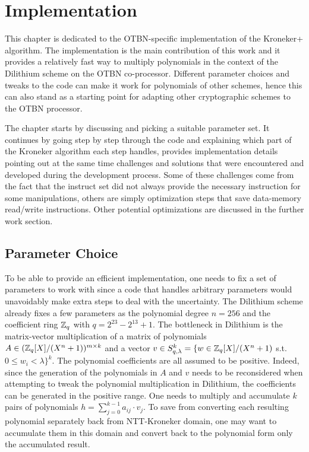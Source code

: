 
\chapter{Implementation}\label{chapter:implementation}

This chapter is dedicated to the OTBN-specific implementation of the Kroneker+ algorithm. The implementation is the main contribution of this work and it provides a relatively fast way to multiply polynomials in the context of the Dilithium scheme on the OTBN co-processor. Different parameter choices and tweaks to the code can make it work for polynomials of other schemes, hence this can also stand as a starting point for adapting other cryptographic schemes to the OTBN processor.

The chapter starts by discussing and picking a suitable parameter set. It continues by going step by step through the code and explaining which part of the Kroneker algorithm each step handles, provides implementation details pointing out at the same time challenges and solutions that were encountered and developed during the development process. Some of these challenges come from the fact that the instruct set did not always provide the necessary instruction for some manipulations, others are simply optimization steps that save data-memory read/write instructions. Other potential optimizations are discussed in the further work section.

\section{Parameter Choice}

To be able to provide an efficient implementation, one needs to fix a set of parameters to work with since a code that handles arbitrary parameters would unavoidably make extra steps to deal with the uncertainty. The Dilithium scheme already fixes a few parameters as the polynomial degree $n = 256$ and the coefficient ring $\mathbb{Z}_q$ with $q = 2^{23} - 2^{13} + 1$. The bottleneck in Dilithium is the matrix-vector multiplication of a matrix of polynomials $A \in (\mathbb{Z}_q[X]/(X^n + 1))^{m \times k}$ and a vector $v \in S_{q, \lambda}^k = \{w \in \mathbb{Z}_q[X]/(X^n + 1)$ s.t. $0 \leq w_i < \lambda\}^k$. The polynomial coefficients are all assumed to be positive. Indeed, since the generation of the polynomials in $A$ and $v$ needs to be reconsidered when attempting to tweak the polynomial multiplication in Dilithium, the coefficients can be generated in the positive range. One needs to multiply and accumulate $k$ pairs of polynomials $h = \sum_{j=0}^{k-1} a_{ij} \cdot v_j$. To save from converting each resulting polynomial separately back from NTT-Kroneker domain, one may want to accumulate them in this domain and convert back to the polynomial form only the accumulated result.

